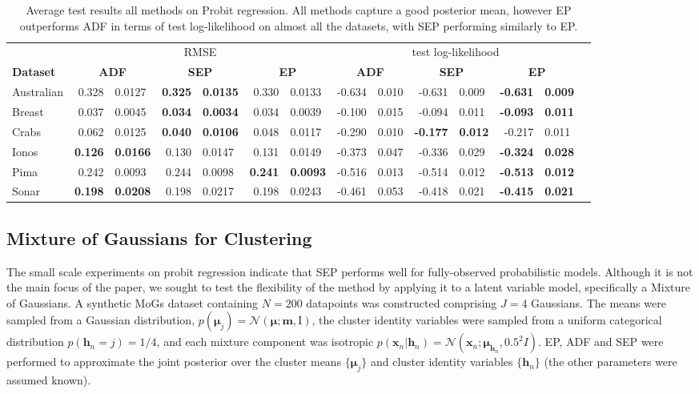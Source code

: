 \begin{table} 
\small
\centering \label{tab:probit_results} \begin{tabular}{l@{\ica}r@{$\pm$}l@{\ica}r@{$\pm$}l@{\ica}r@{$\pm$}l@{\ica}r@{$\pm$}l@{\ica}r@{$\pm$}
	l@{\ica}r@{$\pm$}l@{\ica}r@{$\pm$}}\hline 
{} & \multicolumn{6}{c}{RMSE} & \multicolumn{6}{c}{test log-likelihood} \\
\bf{Dataset}&\multicolumn{2}{c}{\bf{ ADF }}&\multicolumn{2}{c}{\bf{ SEP }}&\multicolumn{2}{c}{\bf{ EP }} &\multicolumn{2}{c}{\bf{ ADF }}&\multicolumn{2}{c}{\bf{ SEP }}&\multicolumn{2}{c}{\bf{ EP }} \\ \hline 
%
Australian&0.328&0.0127&\bf{0.325}&\bf{0.0135}&0.330&0.0133
	&-0.634&0.010&-0.631&0.009&\bf{-0.631}&\bf{0.009}\\
%
Breast&0.037&0.0045&\bf{0.034}&\bf{0.0034}&0.034&0.0039
	&-0.100&0.015&-0.094&0.011&\bf{-0.093}&\bf{0.011}\\
%
Crabs&0.062&0.0125&\bf{0.040}&\bf{0.0106}&0.048&0.0117
	&-0.290&0.010&\bf{-0.177}&\bf{0.012}&-0.217&0.011\\
%
Ionos&\bf{0.126}&\bf{0.0166}&0.130&0.0147&0.131&0.0149
	&-0.373&0.047&-0.336&0.029&\bf{-0.324}&\bf{0.028}\\
%
Pima&0.242&0.0093&0.244&0.0098&\bf{0.241}&\bf{0.0093}
	&-0.516&0.013&-0.514&0.012&\bf{-0.513}&\bf{0.012}\\
%
Sonar&\bf{0.198}&\bf{0.0208}&0.198&0.0217&0.198&0.0243
	&-0.461&0.053&-0.418&0.021&\bf{-0.415}&\bf{0.021}\\
 \hline \end{tabular} 
 \caption{ Average test results all methods on Probit regression. All methods capture a good posterior mean, however EP outperforms ADF in terms of test log-likelihood on almost all the datasets, with SEP performing similarly to EP.}
 \end{table} 
 
\subsection{Mixture of Gaussians for Clustering}
%
The small scale experiments on probit regression indicate that SEP performs well for fully-observed probabilistic models. Although it is not the main focus of the paper, we sought to test the flexibility of the method by applying it to a latent variable model, specifically a Mixture of Gaussians. A synthetic MoGs dataset containing $N=200$ datapoints was constructed comprising $J=4$ Gaussians. The means were sampled from a Gaussian distribution, $p(\bm{\mu}_j)= \mathcal{N}(\bm{\mu}; \bm{m}, \mathrm{I})$, the cluster identity variables were sampled from a uniform categorical distribution $p(\bm{h}_n = j) = 1/4$, and each mixture component was isotropic $p(\bm{x}_n | \bm{h}_n) = \mathcal{N}(\bm{x}_n; \bm{\mu}_{\bm{h}_n}, 0.5^2 I)$. EP, ADF and SEP were performed to approximate the joint posterior over the cluster means $\{ \bm{\mu}_j\}$ and cluster identity variables $\{ \bm{h}_n \}$ (the other parameters were assumed known). 


